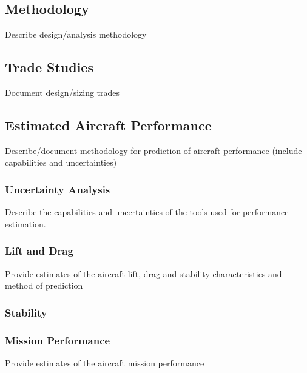 \documentclass[report]{byu-aero}
\begin{document}
\subsection{Methodology}
\label{ssec:methodology}

Describe design/analysis methodology

\subsection{Trade Studies}
\label{ssec:tradestudies}

Document design/sizing trades

\subsection{Estimated Aircraft Performance}
\label{ssec:estaircraftperfomance}

Describe/document methodology for prediction of aircraft performance (include capabilities and uncertainties)

\subsubsection{Uncertainty Analysis}
\label{sssec:uncertaintyanalysis}

Describe the capabilities and uncertainties of the tools used for performance estimation.

\subsubsection{Lift and Drag}
\label{sssec:liftdrag}

Provide estimates of the aircraft lift, drag and stability characteristics and method of prediction

\subsubsection{Stability}
\label{sssec:stability}

\subsubsection{Mission Performance}
\label{sssec:missionperformance}

Provide estimates of the aircraft mission performance 

\end{document}
